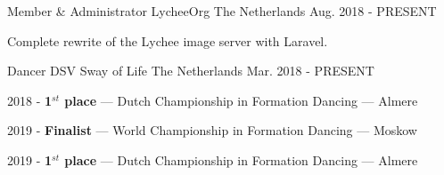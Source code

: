 
\begin{cventries}


  \cventry
    {Member \& Administrator} %
    {LycheeOrg} %
    {The Netherlands} %
    {Aug. 2018 - PRESENT} %
    {
      \begin{cvitems} %
        \item {Complete rewrite of the Lychee image server with Laravel.}
      \end{cvitems}
    }

  \cventry
    {Dancer} %
    {DSV Sway of Life} %
    {The Netherlands} %
    {Mar. 2018 - PRESENT} %
    {
      \begin{cvitems} %
        \item {2018 - \textbf{1$^{st}$ place} --- Dutch Championship in Formation Dancing --- Almere}
        \item {2019 - \textbf{Finalist} --- World Championship in Formation Dancing --- Moskow}
        \item {2019 - \textbf{1$^{st}$ place} --- Dutch Championship in Formation Dancing --- Almere}
      \end{cvitems}
    }

\end{cventries}
